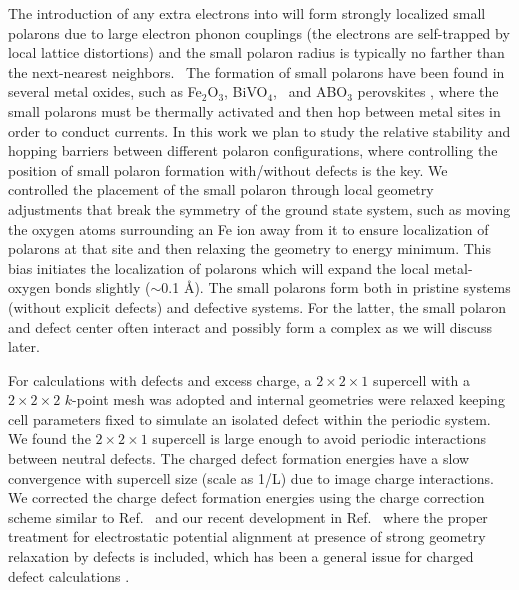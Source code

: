 

The introduction of any extra electrons into  will form strongly localized small polarons due to large electron phonon couplings (the electrons are self-trapped by local lattice distortions) and the small polaron radius is typically no farther than the next-nearest neighbors.~\cite{austin1969polarons} The formation of small polarons have been found in several metal oxides, such as Fe$_2$O$_3$, BiVO$_4$,~\cite{kim2015simultaneous} and ABO$_{3}$ perovskites \cite{eglitis2014ab}, where the small polarons must be thermally activated and then hop between metal sites in order to conduct currents. In this work we plan to study the relative stability and hopping barriers between different polaron configurations, where controlling the position of small polaron formation with/without defects is the key. We controlled the placement of the small polaron through local geometry adjustments that break the symmetry of the ground state system, such as moving the oxygen atoms surrounding an Fe ion away from it to ensure localization of polarons at that site and then relaxing the geometry to energy minimum. This bias initiates the localization of polarons which will expand the local metal-oxygen bonds slightly ($\sim$0.1 \AA).  The small polarons form both in pristine systems (without explicit defects) and defective systems. For the latter, the small polaron and defect center often interact and possibly form a complex as we will discuss later.

For calculations with defects and excess charge, a $2\times 2\times 1$ supercell with a $2\times2\times2$ $k$-point mesh was adopted and internal geometries were relaxed keeping cell parameters fixed to simulate an isolated defect within the periodic system.  We found the $2\times 2\times 1$ supercell is large enough to avoid periodic interactions between neutral defects. The charged defect formation energies have a slow convergence with supercell size (scale as 1/L) due to image charge interactions. We corrected the charge defect formation energies using the charge correction scheme similar to Ref.~\cite{freysoldt2014first} and our recent development in Ref.~\cite{PING2017JCP} where the proper treatment for electrostatic potential alignment at presence of strong geometry relaxation by defects is included, which has been a general issue for charged defect calculations \cite{kumagai2014electrostatics}.



